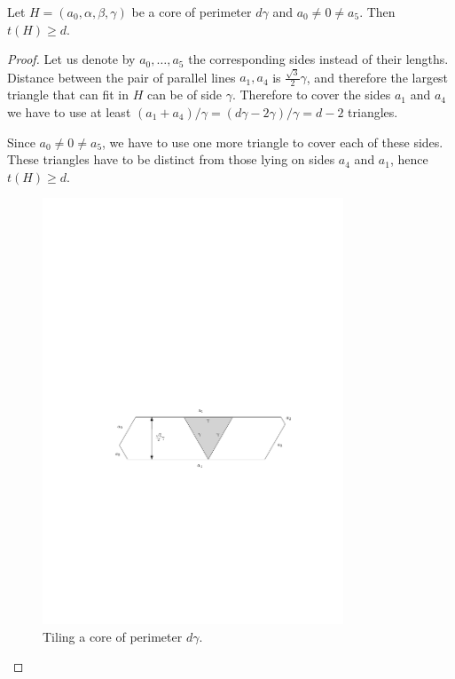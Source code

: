 \begin{lem}
\label{lem:core-dissection-bound}
Let $H = (a_0, \alpha, \beta, \gamma)$ be a core of perimeter $d\gamma$ and $a_0 \ne 0 \ne a_5$. Then $t(H) \geq d$.
\end{lem}
\begin{proof}
Let us denote by $a_0, \dots, a_5$ the corresponding sides instead of their lengths. Distance between the pair of parallel lines $a_1, a_4$ is $\frac{\sqrt{3}}{2}\gamma$, and therefore the largest triangle that can fit in $H$ can be of side $\gamma$. Therefore to cover the sides $a_1$ and $a_4$ we have to use at least $(a_1+a_4)/\gamma = (d\gamma-2\gamma)/\gamma = d-2$ triangles.

Since $a_0 \ne 0 \ne a_5$, we have to use one more triangle to cover each of these sides. These triangles have to be distinct from those lying on sides $a_4$ and $a_1$, hence $t(H) \geq d$.

\begin{figure}[htb]
\centering
\includegraphics[width=0.8\textwidth]{img/core_tiling_lower_bound.pdf}
\caption{Tiling a core of perimeter $d\gamma$.}
\label{fig:core-tiling-lower-bound}
\end{figure}\end{proof}

